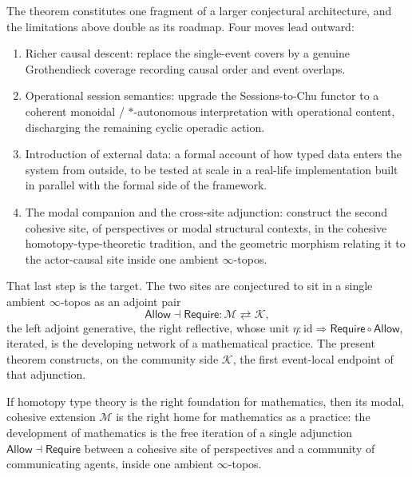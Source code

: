 \documentclass[11pt]{article}
\begin{document}
The theorem constitutes one fragment of a larger conjectural architecture, and
the limitations above double as its roadmap. Four moves lead outward:
\begin{enumerate}[leftmargin=1.6em,itemsep=2pt]
\item Richer causal descent: replace the single-event covers by a genuine
Grothendieck coverage recording causal order and event overlaps.
\item Operational session semantics: upgrade the Sessions-to-Chu functor to a
coherent monoidal / $*$-autonomous interpretation with operational content,
discharging the remaining cyclic operadic action.
\item Introduction of external data: a formal account of how typed data enters
the system from outside, to be tested at scale in a real-life implementation
built in parallel with the formal side of the framework.
\item The modal companion and the cross-site adjunction: construct the second
cohesive site, of perspectives or modal structural contexts, in the cohesive
homotopy-type-theoretic tradition, and the geometric morphism relating it to
the actor-causal site inside one ambient $\infty$-topos.
\end{enumerate}

That last step is the target. The two sites are conjectured to sit in a single
ambient $\infty$-topos as an adjoint pair
\[
  \mathsf{Allow} \dashv \mathsf{Require} :
  \mathcal M \rightleftarrows \mathcal K,
\]
the left adjoint generative, the right reflective, whose unit
$\eta:\mathrm{id}\Rightarrow\mathsf{Require}\circ\mathsf{Allow}$, iterated,
is the developing network of a mathematical practice. The present theorem
constructs, on the community side $\mathcal K$, the first event-local endpoint
of that adjunction.

If homotopy type theory is the right foundation for mathematics, then its modal,
cohesive extension $\mathcal M$ is the right home for mathematics as a practice: the
development of mathematics is the free iteration of a single adjunction
$\mathsf{Allow}\dashv\mathsf{Require}$ between a cohesive site of perspectives
and a community of communicating agents, inside one ambient $\infty$-topos.

\newpage
\end{document}

